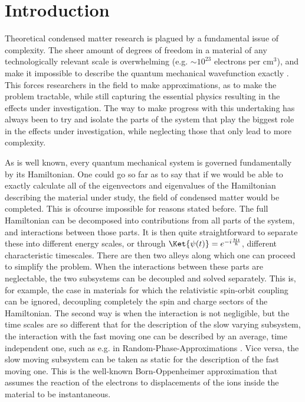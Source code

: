 \chapter{Introduction}
Theoretical condensed matter research is plagued by a fundamental issue of complexity. The sheer amount of degrees of freedom in a material of any technologically relevant scale is overwhelming (e.g. $\sim10^{23}$ electrons per cm$^3$), and make it impossible to describe the quantum mechanical wavefunction exactly . This forces researchers in the field to make approximations, as to make the problem tractable, while still capturing the essential physics resulting in the effects under investigation.
The way to make progress with this undertaking has always been to try and isolate the parts of the system that play the biggest role in the effects under investigation, while neglecting those that only lead to more complexity.

As is well known, every quantum mechanical system is governed fundamentally by its Hamiltonian. One could go so far as to say that if we would be able to exactly calculate all of the eigenvectors and eigenvalues of the Hamiltonian describing the material under study, the field of condensed matter would be completed. This is ofcourse impossible for reasons stated before.
The full Hamiltonian can be decomposed into contributions from all parts of the system, and interactions between those parts.
It is then quite straightforward to separate these into different energy scales, or through $\Ket{\psi(t)} = e^{-i \frac{\mathcal{H}t}{\hbar}}$, different characteristic timescales.
There are then two alleys along which one can proceed to simplify the problem. When the interactions between these parts are neglectable, the two subsystems can be decoupled and solved separately. This is, for example, the case in materials for which the relativistic spin-orbit coupling can be ignored, decoupling completely the spin and charge sectors of the Hamiltonian.
The second way is when the interaction is not negligible, but the time scales are so different that for the description of the slow varying subsystem, the interaction with the fast moving one can be described by an average, time independent one, such as e.g. in Random-Phase-Approximations . Vice versa, the slow moving subsystem can be taken as static for the description of the fast moving one. This is the well-known Born-Oppenheimer approximation that assumes the reaction of the electrons to displacements of the ions inside the material to be instantaneous.

